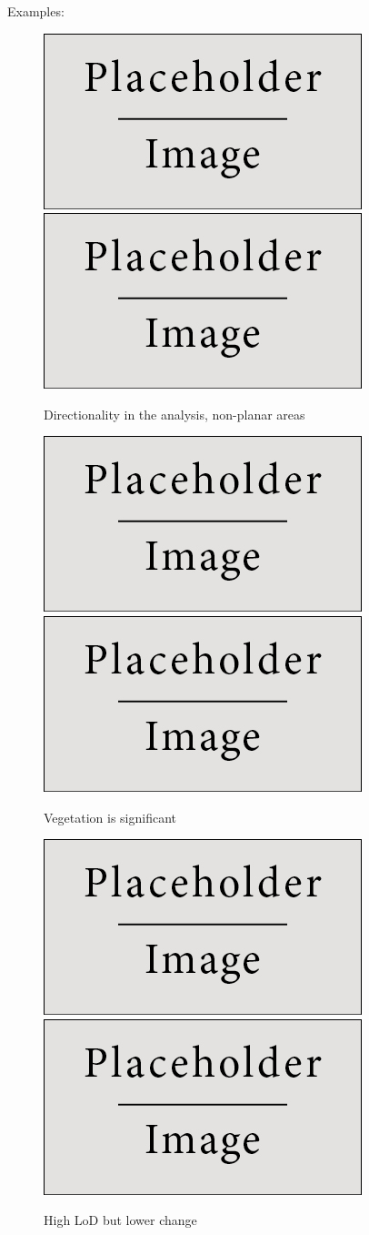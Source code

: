 \documentclass[preprint,12pt,3p]{elsarticle}
\begin{document}
Examples:

\begin{figure}
    \centering
    \includegraphics[width=0.45\linewidth]{placeholder.jpg}
    \includegraphics[width=0.45\linewidth]{placeholder.jpg}
    \caption{Directionality in the analysis, non-planar areas}
    \label{fig:example_1}
\end{figure}
\begin{figure}
    \centering
    \includegraphics[width=0.45\linewidth]{placeholder.jpg}
    \includegraphics[width=0.45\linewidth]{placeholder.jpg}
    \caption{Vegetation is significant}
    \label{fig:example_2}
\end{figure}
\begin{figure}
    \centering
    \includegraphics[width=0.45\linewidth]{placeholder.jpg}
    \includegraphics[width=0.45\linewidth]{placeholder.jpg}
    \caption{High LoD but lower change}
    \label{fig:example_3}
\end{figure}
\end{document}
